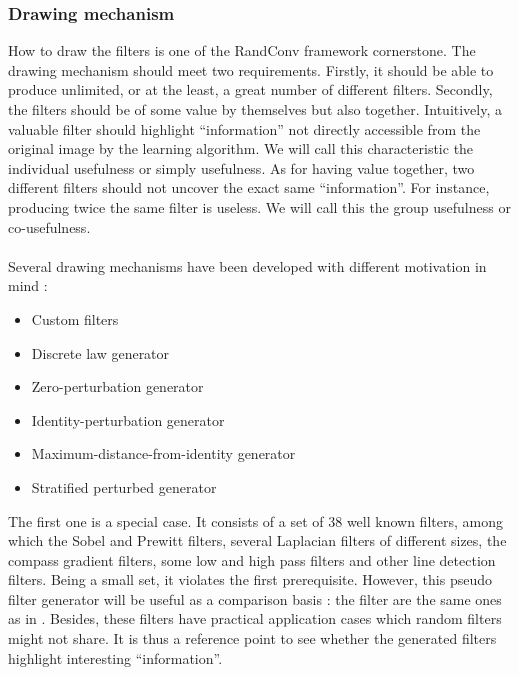 \documentclass[a4paper]{report}
\begin{document}
			
			
			\subsubsection{Drawing mechanism}
			How to draw the filters is one of the RandConv framework cornerstone. The drawing mechanism should meet two requirements. Firstly, it should be able to produce unlimited, or at the least, a great number of different filters. Secondly, the filters should be of some value by themselves but also together. Intuitively, a valuable filter should highlight ``information'' not directly accessible from the original image by the learning algorithm. We will call this characteristic the individual usefulness or simply usefulness. As for having value together, two different filters should not uncover the exact same ``information''. For instance, producing twice the same filter is useless. We will call this the group usefulness or co-usefulness.
			
			\paragraph{}
			Several drawing mechanisms have been developed with different motivation in mind :
			
			\begin{itemize}
				\item Custom filters
				\item Discrete law generator
				\item Zero-perturbation generator
				\item Identity-perturbation generator
				\item Maximum-distance-from-identity generator
				\item Stratified perturbed generator
			\end{itemize}
			
			The first one is a special case. It consists of a set of 38 well known filters, among which the Sobel and Prewitt filters, several Laplacian filters of different sizes, the compass gradient filters, some low and high pass filters and other line detection filters.
			Being a small set, it violates the first prerequisite. However, this pseudo filter generator will be useful as a comparison basis : the filter are the same ones as in \cite{base}. Besides, these filters have practical application cases which random filters might not share. It is thus a reference point to see whether the generated filters highlight interesting ``information''.
\end{document}
